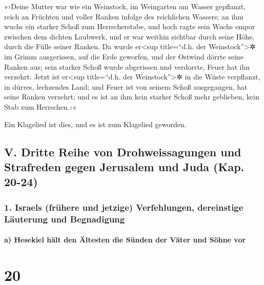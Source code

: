 »›Deine Mutter war wie ein Weinstock, im Weingarten am
Wasser gepflanzt, reich an Früchten und voller Ranken infolge des
reichlichen Wassers; an ihm wuchs ein starker Schoß zum
Herrscherstabe, und hoch ragte sein Wuchs empor zwischen dem dichten
Laubwerk, und er war weithin sichtbar durch seine Höhe, durch die Fülle
seiner Ranken. Da wurde er\textless sup title=``d.h. der
Weinstock''\textgreater✲ im Grimm ausgerissen, auf die Erde geworfen,
und der Ostwind dörrte seine Ranken aus; sein starker Schoß wurde
abgerissen und verdorrte, Feuer hat ihn verzehrt. Jetzt
ist er\textless sup title=``d.h. der Weinstock''\textgreater✲ in die
Wüste verpflanzt, in dürres, lechzendes Land; und Feuer
ist von seinem Schoß ausgegangen, hat seine Ranken verzehrt; und es ist
an ihm kein starker Schoß mehr geblieben, kein Stab zum Herrschen.‹«

Ein Klagelied ist dies, und es ist zum Klagelied geworden.

\hypertarget{v.-dritte-reihe-von-drohweissagungen-und-strafreden-gegen-jerusalem-und-juda-kap.-20-24}{%
\subsection{V. Dritte Reihe von Drohweissagungen und Strafreden gegen
Jerusalem und Juda (Kap.
20-24)}\label{v.-dritte-reihe-von-drohweissagungen-und-strafreden-gegen-jerusalem-und-juda-kap.-20-24}}

\hypertarget{israels-fruxfchere-und-jetzige-verfehlungen-dereinstige-luxe4uterung-und-begnadigung}{%
\subsubsection{1. Israels (frühere und jetzige) Verfehlungen,
dereinstige Läuterung und
Begnadigung}\label{israels-fruxfchere-und-jetzige-verfehlungen-dereinstige-luxe4uterung-und-begnadigung}}

\hypertarget{a-hesekiel-huxe4lt-den-uxe4ltesten-die-suxfcnden-der-vuxe4ter-und-suxf6hne-vor}{%
\paragraph{a) Hesekiel hält den Ältesten die Sünden der Väter und Söhne
vor}\label{a-hesekiel-huxe4lt-den-uxe4ltesten-die-suxfcnden-der-vuxe4ter-und-suxf6hne-vor}}

\hypertarget{section-19}{%
\section{20}\label{section-19}}

